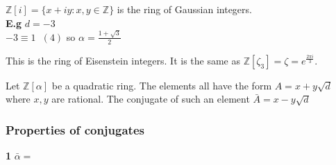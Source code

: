 \documentclass[11pt]{article}
\begin{document}
$\mathbb{Z}[i] = \{x+iy : x,y \in \mathbb{Z} \} $ is the ring of Gaussian integers.\\[1em]
\newpage
\textbf{E.g} $d=-3 $\\
$-3 \equiv 1 \hspace{7pt} (4) $ so $\alpha = \frac{1+\sqrt{3}}{2}$

This is the ring of Eisenstein integers. It is the same as $\mathbb{Z}[\zeta_3] = \zeta = e^{\frac{2\pi i }{3}}$.

\begin{definition}
	Let $\mathbb{Z}[\alpha]$ be a quadratic ring. The elements all have the form $A = x + y\sqrt{d}$ where $x,y$ are rational. The conjugate of such an element $\bar A = x-y \sqrt{d}$
\end{definition}


\subsubsection{Properties of conjugates}


\textbf{1} $\bar \alpha = $
\end{document}
